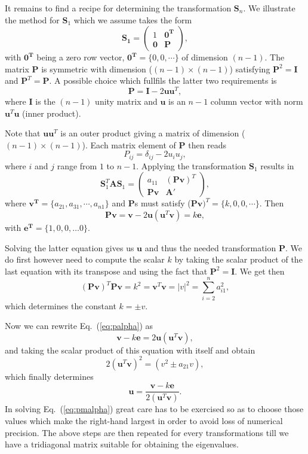 \documentclass[%
oneside,                 %
final,                   %
10pt]{article}
\begin{document}
It remains to find a recipe for determining the transformation $\mathbf{S}_n$.
We illustrate the method for $\mathbf{S}_1$ which we assume takes the form
\[
    \mathbf{S_{1}} = \left( \begin{array}{cc} 1 & \mathbf{0^{T}} \\
                              \mathbf{0}& \mathbf{P} \end{array} \right),
\]
with $\mathbf{0^{T}}$ being a zero row vector, $\mathbf{0^{T}} = \{0,0,\cdots\}$
of dimension $(n-1)$. The matrix $\mathbf{P}$  is symmetric 
with dimension ($(n-1) \times (n-1)$) satisfying
$\mathbf{P}^2=\mathbf{I}$  and $\mathbf{P}^T=\mathbf{P}$. 
A possible choice which fullfils the latter two requirements is 
\[
    \mathbf{P}=\mathbf{I}-2\mathbf{u}\mathbf{u}^T,
\]
where $\mathbf{I}$ is the $(n-1)$ unity matrix and $\mathbf{u}$ is an $n-1$
column vector with norm $\mathbf{u}^T\mathbf{u}$ (inner product).

 Note that $\mathbf{u}\mathbf{u}^T$ is an outer product giving a
matrix of dimension ($(n-1) \times (n-1)$). 
Each matrix element of $\mathbf{P}$ then reads
\[
   P_{ij}=\delta_{ij}-2u_iu_j,
\]
where $i$ and $j$ range from $1$ to $n-1$. Applying the transformation  
$\mathbf{S}_1$ results in 
\[
   \mathbf{S}_1^T\mathbf{A}\mathbf{S}_1 =  \left( \begin{array}{cc} a_{11} & (\mathbf{Pv})^T \\
                              \mathbf{Pv}& \mathbf{A}' \end{array} \right) ,
\]
where $\mathbf{v^{T}} = \{a_{21}, a_{31},\cdots, a_{n1}\}$ and $\mathbf{P}$s
must satisfy ($\mathbf{Pv})^{T} = \{k, 0, 0,\cdots \}$. Then
\begin{equation}
    \mathbf{Pv} = \mathbf{v} -2\mathbf{u}( \mathbf{u}^T\mathbf{v})= k \mathbf{e},
    \label{eq:palpha}
\end{equation}
with $\mathbf{e^{T}} = \{1,0,0,\dots 0\}$.

Solving the latter equation gives us $\mathbf{u}$ and thus the needed transformation
$\mathbf{P}$. We do first however need to compute the scalar $k$ by taking the scalar
product of the last equation with its transpose and using the fact that $\mathbf{P}^2=\mathbf{I}$.
We get then
\[
   (\mathbf{Pv})^T\mathbf{Pv} = k^{2} = \mathbf{v}^T\mathbf{v}=
   |v|^2 = \sum_{i=2}^{n}a_{i1}^2,
\]
which determines the constant $ k = \pm v$.

 Now we can rewrite Eq.~(\ref{eq:palpha})
as 
\[
    \mathbf{v} - k\mathbf{e} = 2\mathbf{u}( \mathbf{u}^T\mathbf{v}),
\]
and taking the scalar product of this equation with itself and obtain
\begin{equation}
    2( \mathbf{u}^T\mathbf{v})^2=(v^2\pm a_{21}v),
    \label{eq:pmalpha}
\end{equation}
which finally determines 
\[
    \mathbf{u}=\frac{\mathbf{v}-k\mathbf{e}}{2( \mathbf{u}^T\mathbf{v})}.
\]
In solving Eq.~(\ref{eq:pmalpha}) great care has to be exercised so as to choose
those values which make the right-hand largest in order to avoid loss of numerical
precision. 
The above steps are then repeated for every transformations till we have a 
tridiagonal matrix suitable for obtaining the eigenvalues.  
\end{document}
